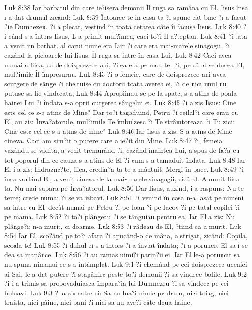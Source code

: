 Luk 8:38  Iar barbatul din care ie?isera demonii Îl ruga sa ramâna cu El. Iisus însa i-a dat drumul zicând:
Luk 8:39  Întoarce-te în casa ta ?i spune cât bine ?i-a facut ?ie Dumnezeu. ?i a plecat, vestind în toata cetatea câte îi facuse Iisus.
Luk 8:40  ?i când s-a întors Iisus, L-a primit mul?imea, caci to?i Îl a?teptau.
Luk 8:41  ?i iata a venit un barbat, al carui nume era Iair ?i care era mai-marele sinagogii. ?i cazând la picioarele lui Iisus, Îl ruga sa intre în casa Lui,
Luk 8:42  Caci avea numai o fiica, ca de doisprezece ani, ?i ea era pe moarte. ?i, pe când se ducea El, mul?imile Îl împresurau.
Luk 8:43  ?i o femeie, care de doisprezece ani avea scurgere de sânge ?i cheltuise cu doctorii toata averea ei, ?i de nici unul nu putuse sa fie vindecata,
Luk 8:44  Apropiindu-se pe la spate, s-a atins de poala hainei Lui ?i îndata s-a oprit curgerea sângelui ei.
Luk 8:45  ?i a zis Iisus: Cine este cel ce s-a atins de Mine? Dar to?i tagaduind, Petru ?i ceilal?i care erau cu El, au zis: Înva?atorule, mul?imile Te îmbulzesc ?i Te strâmtoreaza ?i Tu zici: Cine este cel ce s-a atins de mine?
Luk 8:46  Iar Iisus a zis: S-a atins de Mine cineva. Caci am sim?it o putere care a ie?it din Mine.
Luk 8:47  ?i, femeia, vazându-se vadita, a venit tremurând ?i, cazând înaintea Lui, a spus de fa?a cu tot poporul din ce cauza s-a atins de El ?i cum s-a tamaduit îndata.
Luk 8:48  Iar El i-a zis: Îndrazne?te, fiica, credin?a ta te-a mântuit. Mergi în pace.
Luk 8:49  ?i înca vorbind El, a venit cineva de la mai-marele sinagogii, zicând: A murit fiica ta. Nu mai supara pe Înva?atorul.
Luk 8:50  Dar Iisus, auzind, i-a raspuns: Nu te teme; crede numai ?i se va izbavi.
Luk 8:51  ?i venind în casa n-a lasat pe nimeni sa intre cu El, decât numai pe Petru ?i pe Ioan ?i pe Iacov ?i pe tatal copilei ?i pe mama.
Luk 8:52  ?i to?i plângeau ?i se tânguiau pentru ea. Iar El a zis: Nu plânge?i; n-a murit, ci doarme.
Luk 8:53  ?i râdeau de El, ?tiind ca a murit.
Luk 8:54  Iar El, sco?ând pe to?i afara ?i apucând-o de mâna, a strigat, zicând: Copila, scoala-te!
Luk 8:55  ?i duhul ei s-a întors ?i a înviat îndata; ?i a poruncit El sa i se dea sa manânce.
Luk 8:56  ?i au ramas uimi?i parin?ii ei. Iar El le-a poruncit sa nu spuna nimanui ce s-a întâmplat.
Luk 9:1  ?i chemând pe cei doisprezece ucenici ai Sai, le-a dat putere ?i stapânire peste to?i demonii ?i sa vindece bolile.
Luk 9:2  ?i i-a trimis sa propovaduiasca împara?ia lui Dumnezeu ?i sa vindece pe cei bolnavi.
Luk 9:3  ?i a zis catre ei: Sa nu lua?i nimic pe drum, nici toiag, nici traista, nici pâine, nici bani ?i nici sa nu ave?i câte doua haine.
